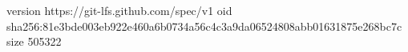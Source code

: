 version https://git-lfs.github.com/spec/v1
oid sha256:81e3bde003eb922e460a6b0734a56c4c3a9da06524808abb01631875e268bc7c
size 505322
